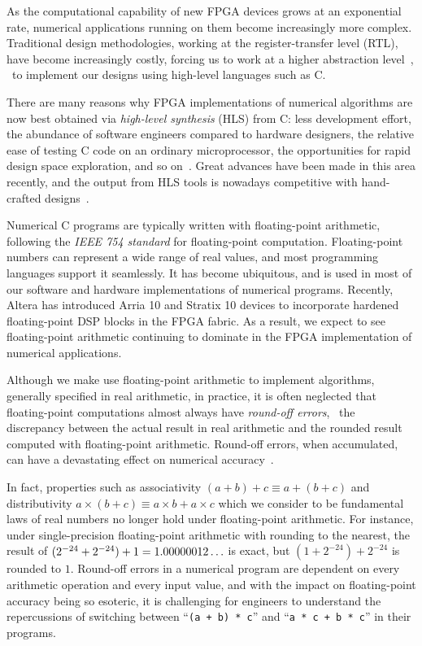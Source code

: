 As the computational capability of new FPGA devices grows at an exponential
rate, numerical applications running on them become increasingly more complex.
Traditional design methodologies, working at the register-transfer level (RTL),
have become increasingly costly, forcing us to work at a higher abstraction
level~\cite{gajski}, \ie~to implement our designs using high-level languages
such as C\@.

There are many reasons why FPGA implementations of numerical algorithms
are now best obtained via \emph{high-level synthesis} (HLS) from C\@:
less development effort, the abundance of software engineers compared to
hardware designers, the relative ease of testing C code on an ordinary
microprocessor, the opportunities for rapid design space exploration, and
so on~\cite{meeus12}. Great advances have been made in this area recently,
and the output from HLS tools is nowadays competitive with hand-crafted
designs~\cite{bdti_xilinx}.

Numerical C programs are typically written with floating-point arithmetic,
following the \emph{IEEE 754 standard} for floating-point computation.
Floating-point numbers can represent a wide range of real values, and most
programming languages support it seamlessly.  It has become ubiquitous, and
is used in most of our software and hardware implementations of numerical
programs.  Recently, Altera has introduced Arria 10 and Stratix 10 devices
to incorporate hardened floating-point DSP blocks in the FPGA fabric.  As a
result, we expect to see floating-point arithmetic continuing to dominate in
the FPGA implementation of numerical applications.

Although we make use floating-point arithmetic to implement algorithms,
generally specified in real arithmetic, in practice, it is often neglected that
floating-point computations almost always have \emph{round-off errors}, \ie~the
discrepancy between the actual result in real arithmetic and the rounded result
computed with floating-point arithmetic.  Round-off errors, when accumulated,
can have a devastating effect on numerical accuracy~\cite{higham02}.

In fact, properties such as associativity $(a + b) + c \equiv a + (b + c)$
and distributivity $a \times (b + c) \equiv a \times b + a \times c$ which
we consider to be fundamental laws of real numbers no longer hold under
floating-point arithmetic.  For instance, under single-precision floating-point
arithmetic with rounding to the nearest, the result of $(2^{-24} + 2^{-24})
+ 1 = 1.00000012\mathellipsis$ is exact, but $(1 + 2^{-24}) + 2^{-24}$ is
rounded to $1$.  Round-off errors in a numerical program are dependent on
every arithmetic operation and every input value, and with the impact on
floating-point accuracy being so esoteric, it is challenging for engineers to
understand the repercussions of switching between ``\verb|(a + b) * c|'' and
``\verb|a * c + b * c|'' in their programs.

